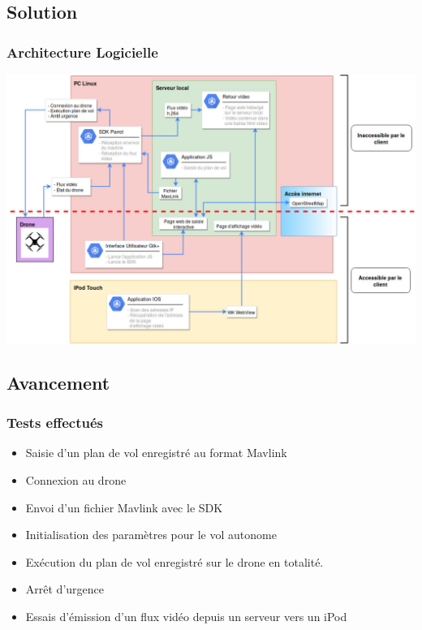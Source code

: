 \documentclass{beamer}
\begin{document}
	\begin{frame}
		\section{Solution}
		\begin{center}
		\frametitle{Architecture Logicielle}
       
        \includegraphics[scale=0.3]{Architecture_logicielle_v2.jpg}
		\end{center}
	\end{frame}
	

	
	
	\begin{frame}
		\section{Avancement}
		\begin{center}
		\frametitle{Tests effectués}
           	\begin{itemize}
           	    \item Saisie d'un plan de vol enregistré au format Mavlink
                \item Connexion au drone
                \item Envoi d'un fichier Mavlink avec le SDK
                \item Initialisation des paramètres pour le vol autonome
                \item Exécution du plan de vol enregistré sur le drone en totalité.
                 \item Arrêt d'urgence
                \item Essais d'émission d'un flux vidéo depuis un serveur vers un iPod
            \end{itemize}
		\end{center}
	\end{frame}
	
\end{document}

